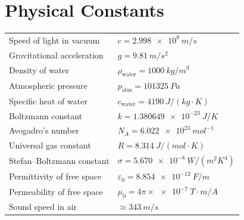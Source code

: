 \documentclass[11pt]{article}
\begin{document}
\section*{Physical Constants}
\begin{tabular}{ll}
Speed of light in vacuum & $c = \SI{2.998e8}{m/s}$ \\
Gravitational acceleration & $g = \SI{9.81}{m/s^{2}}$ \\
Density of water & $\rho_{\text{water}} = \SI{1000}{kg/m^{3}}$ \\
Atmospheric pressure & $p_{\text{atm}} = \SI{101325}{Pa}$ \\
Specific heat of water & $c_{\text{water}} = \SI{4190}{J/(kg\cdot K)}$ \\
Boltzmann constant & $k = \SI{1.380649e-23}{J/K}$ \\
Avogadro's number & $N_A = \SI{6.022e23}{mol^{-1}}$ \\
Universal gas constant & $R = \SI{8.314}{J/(mol\cdot K)}$ \\
Stefan--Boltzmann constant & $\sigma = \SI{5.670e-8}{W/(m^{2}K^{4})}$ \\
Permittivity of free space & $\varepsilon_0 = \SI{8.854e-12}{F/m}$ \\
Permeability of free space & $\mu_0 = 4\pi\times\SI{e-7}{T\cdot m/A}$ \\
Sound speed in air & $\approx \SI{343}{m/s}$ \\
\end{tabular}
\end{document}
